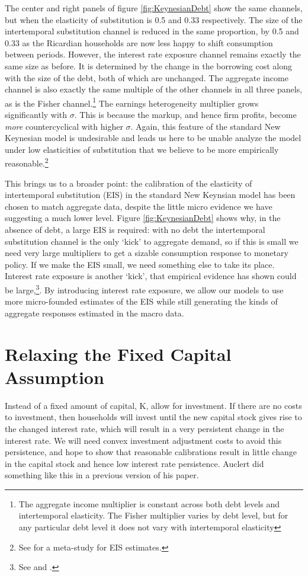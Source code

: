 \documentclass[titlepage]{\econtex}\newcommand{\texname}{ConsumptionHeterogeneity}
\begin{document}
The center and right panels of figure \ref{fig:KeynesianDebt} show the same channels, but when the elasticity of substitution is 0.5 and 0.33 respectively. The size of the intertemporal substitution channel is reduced in the same proportion, by 0.5 and 0.33 as the Ricardian households are now less happy to shift consumption between periods. However, the interest rate exposure channel remains exactly the same size as before. It is determined by the change in the borrowing cost along with the size of the debt, both of which are unchanged. The aggregate income channel is also exactly the same multiple of the other channels in all three panels, as is the Fisher channel.\footnote{The aggregate income multiplier is constant across both debt levels and intertemporal elasticity. The Fisher multiplier varies by debt level, but for any particular debt level it does not vary with intertemporal elasticity} The earnings heterogeneity multiplier grows significantly with $\sigma$. This is because the markup, and hence firm profits, become \textit{more} countercyclical with higher $\sigma$. Again, this feature of the standard New Keynesian model is undesirable and leads us here to be unable analyze the model under low elasticities of substitution that we believe to be more empirically reasonable.\footnote{See \cite{havranek_measuring_2015} for a meta-study for EIS estimates.}

This brings us to a broader point: the calibration of the elasticity of intertemporal substitution (EIS) in the standard New Keynsian model has been chosen to match aggregate data, despite the little micro evidence we have suggesting a much lower level. Figure \ref{fig:KeynesianDebt} shows why, in the absence of debt, a large EIS is required: with no debt the intertemporal substitution channel is the only `kick' to aggregate demand, so if this is small we need very large multipliers to get a sizable consumption response to monetary policy. If we make the EIS small, we need something else to take its place. Interest rate exposure is another `kick', that empirical evidence has shown could be large,\footnote{See \cite{auclert_monetary_2017} and \cite{ckConsumption}.}. By introducing interest rate exposure, we allow our models to use more micro-founded estimates of the EIS while still generating the kinds of aggregate responses estimated in the macro data.

\section{Relaxing the Fixed Capital Assumption}
Instead of a fixed amount of capital, K, allow for investment. If there are no costs to investment, then households will invest until the new capital stock gives rise to the changed interest rate, which will result in a very persistent change in the interest rate. We will need convex investment adjustment costs to avoid this persistence, and hope to show that reasonable calibrations result in little change in the capital stock and hence low interest rate persistence. Auclert did something like this in a previous version of his paper.
\end{document}
